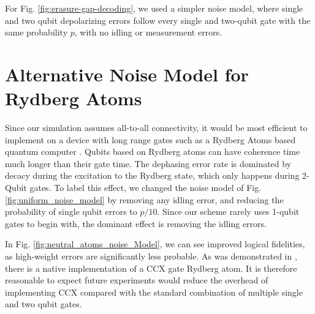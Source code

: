 \documentclass[twocolumn,notitlepage,nofootinbib,floatfix,superscriptaddress]{revtex4-1}
\begin{document}
For Fig. \ref{fig:erasure-gap-decoding}, we used a simpler noise model, where single and two qubit depolarizing errors follow every single and two-qubit gate with the same probability $p$, with no idling or measurement errors.

\section{Alternative Noise Model for Rydberg Atoms}
\label{SI:rydbergatoms_noise}

Since our simulation assumes all-to-all connectivity, it would be most efficient to implement on a device with long range gates such as a Rydberg Atoms based quantum computer \cite{saffman2010quantum, bluvstein2024logical}.  Qubits based on Rydberg atoms can have coherence time much longer than their gate time. The dephasing error rate is dominated by decacy during the excitation to the Rydberg state, which only happens during 2-Qubit gates. To label this effect, we changed the noise model of Fig. \ref{fig:uniform_noise_model} by removing any idling error, and reducing the probability of single qubit errors to $p/10$. Since our scheme rarely uses 1-qubit gates to begin with, the dominant effect is removing the idling errors. 

In Fig. \ref{fig:neutral_atoms_noise_Model}, we can see improved logical fidelities, as high-weight errors are significantly less probable. As was demonstrated in \cite{levine2019parallel, evered2023high}, there is a native implementation of a CCX gate Rydberg atom. It is therefore reasonable to expect future experiments would reduce the overhead of implementing CCX compared with the standard combination of multiple single and two qubit gates. 
\end{document}
